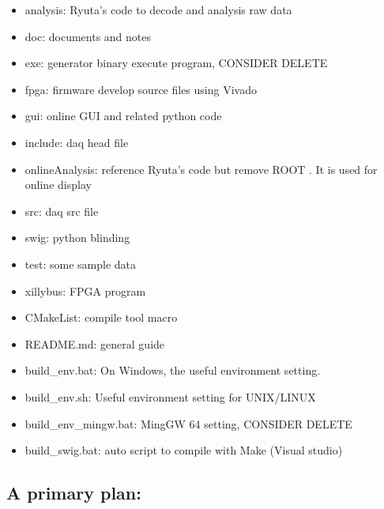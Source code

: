 \documentclass{article}
\begin{document}
        \begin{itemize}
            
            \item analysis: Ryuta’s code to decode and analysis raw data
            \item doc: documents and notes
            \item exe: generator binary execute program, CONSIDER DELETE
            \item fpga: firmware develop source files using Vivado
            \item gui: online GUI and related python code
            \item include: daq head file
            \item onlineAnalysis: reference Ryuta’s code but remove ROOT . It is used for online display
            \item src: daq src file
            \item swig: python blinding
            \item test: some sample data
            \item xillybus: FPGA program
            \item CMakeList: compile tool macro
            \item README.md: general guide 
            \item build\_env.bat: On Windows, the useful  environment setting.
            \item build\_env.sh: Useful environment setting for UNIX/LINUX
            \item build\_env\_mingw.bat: MingGW 64 setting, CONSIDER DELETE
            \item build\_swig.bat: auto script to compile with Make (Visual studio)
                
        \end{itemize}
        
    \subsection{A primary plan:}
        
\end{document}
